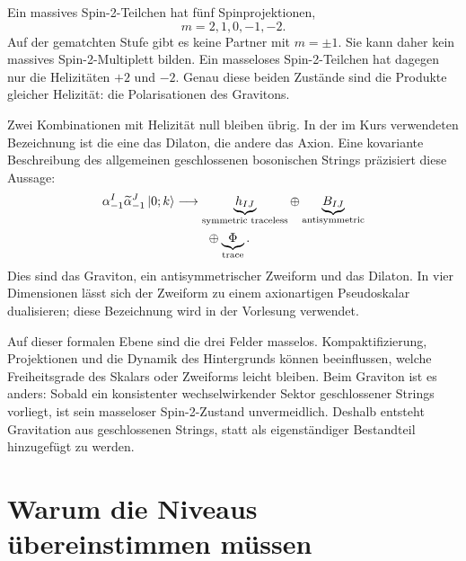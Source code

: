 Ein massives Spin-2-Teilchen hat fünf Spinprojektionen,
\begin{equation}
  m=2,1,0,-1,-2.
\end{equation}
Auf der gematchten Stufe gibt es keine Partner mit \(m=\pm1\). Sie kann daher kein massives Spin-2-Multiplett bilden. Ein masseloses Spin-2-Teilchen hat dagegen nur die Helizitäten \(+2\) und \(-2\). Genau diese beiden Zustände sind die Produkte gleicher Helizität: die Polarisationen des Gravitons.

Zwei Kombinationen mit Helizität null bleiben übrig. In der im Kurs verwendeten Bezeichnung ist die eine das Dilaton, die andere das Axion. Eine kovariante Beschreibung des allgemeinen geschlossenen bosonischen Strings präzisiert diese Aussage:
\begin{equation}
  \begin{aligned}
    \alpha_{-1}^{I}\widetilde\alpha_{-1}^{J}\left\lvert0;k\right\rangle
    &\longrightarrow
    \underbrace{h_{IJ}}_{\text{symmetric traceless}}
    \oplus
    \underbrace{B_{IJ}}_{\text{antisymmetric}}\\
    &\hspace{2.5em}\oplus
    \underbrace{\Phi}_{\text{trace}}.
  \end{aligned}
  \label{eq:l04-massless-tensor-decomposition}
\end{equation}
Dies sind das Graviton, ein antisymmetrischer Zweiform und das Dilaton. In vier Dimensionen lässt sich der Zweiform zu einem axionartigen Pseudoskalar dualisieren; diese Bezeichnung wird in der Vorlesung verwendet.

Auf dieser formalen Ebene sind die drei Felder masselos. Kompaktifizierung, Projektionen und die Dynamik des Hintergrunds können beeinflussen, welche Freiheitsgrade des Skalars oder Zweiforms leicht bleiben. Beim Graviton ist es anders: Sobald ein konsistenter wechselwirkender Sektor geschlossener Strings vorliegt, ist sein masseloser Spin-2-Zustand unvermeidlich. Deshalb entsteht Gravitation aus geschlossenen Strings, statt als eigenständiger Bestandteil hinzugefügt zu werden.

\section{Warum die Niveaus übereinstimmen müssen}

